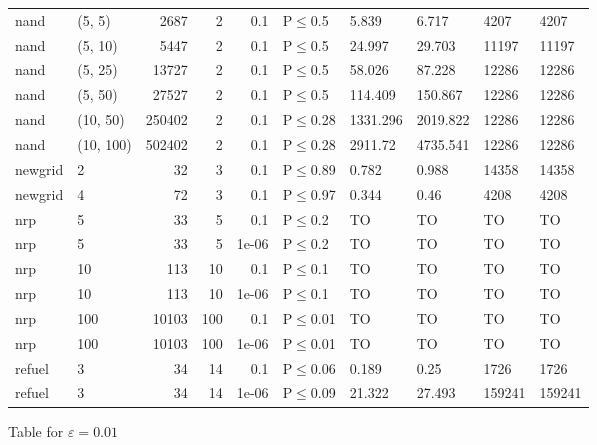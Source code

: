 \begin{longtable}{llrrrlllll}
 nand          & (5, 5)    &   	2687 &   2 & 0.1   & P$\leq$0.5   & 5.839    & 6.717    & 4207   & 4207   \\
 nand          & (5, 10)   &   	5447 &   2 & 0.1   & P$\leq$0.5   & 24.997   & 29.703   & 11197  & 11197  \\
 nand          & (5, 25)   &  	13727 &   2 & 0.1   & P$\leq$0.5   & 58.026   & 87.228   & 12286  & 12286  \\
 nand          & (5, 50)   &  	27527 &   2 & 0.1   & P$\leq$0.5   & 114.409  & 150.867  & 12286  & 12286  \\
 nand          & (10, 50)  & 	250402 &   2 & 0.1   & P$\leq$0.28  & 1331.296 & 2019.822 & 12286  & 12286  \\
 nand          & (10, 100) & 	502402 &   2 & 0.1   & P$\leq$0.28  & 2911.72  & 4735.541 & 12286  & 12286  \\
 newgrid       & 2         &     	32 &   3 & 0.1   & P$\leq$0.89  & 0.782    & 0.988    & 14358  & 14358  \\
 newgrid       & 4         &     	72 &   3 & 0.1   & P$\leq$0.97  & 0.344    & 0.46     & 4208   & 4208   \\
 nrp           & 5         &     	33 &   5 & 0.1   & P$\leq$0.2   & TO       & TO       & TO     & TO     \\
 nrp           & 5         &     	33 &   5 & 1e-06 & P$\leq$0.2   & TO       & TO       & TO     & TO     \\
 nrp           & 10        &    	113 &  10 & 0.1   & P$\leq$0.1   & TO       & TO       & TO     & TO     \\
 nrp           & 10        &    	113 &  10 & 1e-06 & P$\leq$0.1   & TO       & TO       & TO     & TO     \\
 nrp           & 100       &  	10103 & 100 & 0.1   & P$\leq$0.01  & TO       & TO       & TO     & TO     \\
 nrp           & 100       &  	10103 & 100 & 1e-06 & P$\leq$0.01  & TO       & TO       & TO     & TO     \\
 refuel        & 3         &     	34 &  14 & 0.1   & P$\leq$0.06  & 0.189    & 0.25     & 1726   & 1726   \\
 refuel        & 3         &     	34 &  14 & 1e-06 & P$\leq$0.09  & 21.322   & 27.493   & 159241 & 159241 \\
\bottomrule
\end{longtable}
\small Table for \(\varepsilon=0.01\)
